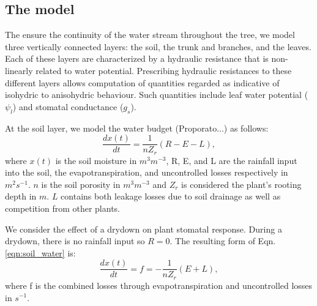 \documentclass[utf8]{frontiersSCNS} %
\begin{document}
\subsection{The model}

The ensure the continuity of the water stream throughout the tree, we model three vertically connected layers: the soil, the trunk and branches, and the leaves. Each of these layers are characterized by a hydraulic resistance that is non-linearly related to water potential. Prescribing hydraulic resistances to these different layers allows computation of quantities regarded as indicative of isohydric to anisohydric behaviour. Such quantities include leaf water potential ($\psi_l$) and stomatal conductance ($g_s$).

At the soil layer, we model the water budget (Proporato...) as follows:
\begin{equation}
    \label{eqn:soil_water}
    \frac{dx(t)}{dt} =\frac{1}{n Z_r}(R - E - L),
\end{equation}
where $x(t)$ is the soil moisture in $m^3m^{-3}$, R, E, and L are the rainfall input into the soil, the evapotranspiration, and uncontrolled losses respectively in $m^2s^{-1}$. $n$ is the soil porosity in $m^3m^{-3}$ and $Z_r$ is considered the plant's rooting depth in $m$. $L$ contains both leakage losses due to soil drainage as well as competition from other plants.

We consider the effect of a drydown on plant stomatal response. During a drydown, there is no rainfall input so $R=0$. The resulting form of Eqn. \ref{eqn:soil_water} is:
\begin{equation}
    \label{eeqn:soil_water_drydown}
    \frac{dx(t)}{dt} = f = - \frac{1}{n Z_r}(E + L),
\end{equation}
where f is the combined losses through evapotranspiration and uncontrolled losses in $s^{-1}$.
\end{document}
